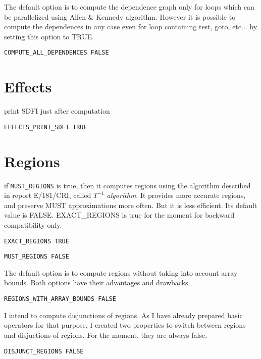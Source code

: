 The default option is to compute the dependence graph only for loops
which can be parallelized using Allen \& Kennedy algorithm.
However it is possible to
compute the dependences in any case even for loop containing test, goto,
etc...
by setting this option to TRUE.

\begin{verbatim}
COMPUTE_ALL_DEPENDENCES FALSE
\end{verbatim}

\section{Effects}

print SDFI just after computation

\begin{verbatim}
EFFECTS_PRINT_SDFI TRUE
\end{verbatim}

\section{Regions}

if {\tt MUST\_REGIONS} is true, then it computes regions using the algorithm
described in report E/181/CRI, called {\em $T^{-1}$ algorithm}. It provides more
accurate regions, and preserve MUST approximations more often. But it is less
efficient. Its default value is FALSE. EXACT\_REGIONS is true for the moment for
backward compatibility only.

\begin{verbatim}
EXACT_REGIONS TRUE
\end{verbatim}

\begin{verbatim}
MUST_REGIONS FALSE
\end{verbatim}

The default option is to compute regions without taking into account array
bounds. Both options have their advantages and drawbacks. 

\begin{verbatim}
REGIONS_WITH_ARRAY_BOUNDS FALSE
\end{verbatim}

I intend to compute disjunctions of regions. As I have already prepared basic
operators for that purpose, I created two properties to switch between regions
and disjuctions of regions. For the moment, they are always false.

\begin{verbatim}
DISJUNCT_REGIONS FALSE
\end{verbatim}

